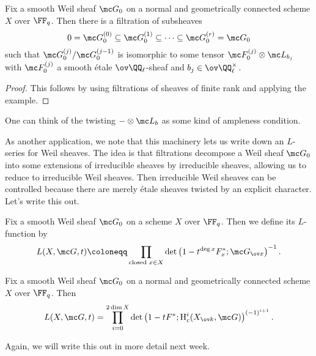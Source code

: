 \documentclass[../notes.tex]{subfiles}
\begin{document}
\begin{corollary}
	Fix a smooth Weil sheaf $\mc G_0$ on a normal and geometrically connected scheme $X$ over $\FF_q$. Then there is a filtration of subsheaves
	\[0=\mc G_{0}^{(0)}\subseteq\mc G_{0}^{(1)}\subseteq\cdots\subseteq\mc G_{0}^{(r)}=\mc G_0\]
	such that $\mc G_{0}^{(j)}/\mc G_{0}^{(j-1)}$ is isomorphic to some tensor $\mc F_0^{(j)}\otimes\mc L_{b_j}$ with $\mc F_0^{(j)}$ a smooth \'etale $\ov\QQ_\ell$-sheaf and $b_j\in\ov\QQ_\ell^\times$.
\end{corollary}
\begin{proof}
	This follows by using filtrations of sheaves of finite rank and applying the example.
\end{proof}
\begin{remark}
	One can think of the twisting $-\otimes\mc L_b$ as some kind of ampleness condition.
\end{remark}
As another application, we note that this machinery lets us write down an $L$-series for Weil sheaves. The idea is that filtrations decompose a Weil sheaf $\mc G_0$ into some extensions of irreducible sheaves by irreducible sheaves, allowing us to reduce to irreducible Weil sheaves. Then irreducible Weil sheaves can be controlled because there are merely \'etale sheaves twisted by an explicit character. Let's write this out.
\begin{notation}
	Fix a smooth Weil sheaf $\mc G_0$ on a scheme $X$ over $\FF_q$. Then we define its $L$-function by
	\[L(X,\mc G,t)\coloneqq\prod_{\text{closed }x\in X}\det\left(1-t^{\deg x}F_x^*;\mc G_{\ov x}\right)^{-1}.\]
\end{notation}
\begin{corollary} \label{cor:}
	Fix a smooth Weil sheaf $\mc G_0$ on a normal and geometrically connected scheme $X$ over $\FF_q$. Then
	\[L(X,\mc G,t)=\prod_{i=0}^{2\dim X}\det\left(1-tF^*;\mathrm H^i_c(X_{\ov k},\mc G)\right)^{(-1)^{i+1}}.\]
\end{corollary}
Again, we will write this out in more detail next week.
\end{document}
